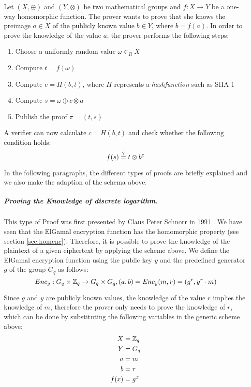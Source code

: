 \documentclass[numbers=noenddot, abstract=on, a4paper, headsepline,
footsepline, oneside, draft=off]{scrreprt}
\newcommand{\myref}[1]{(see section \vref{#1})}
\begin{document}
Let $(X,\oplus)$ and $(Y,\otimes)$ be two mathematical groups and
$f:X \rightarrow Y$ be a one-way homomorphic function. The prover wants to prove
that she knows the preimage $a \in X$ of the publicly known value $b \in Y$,
where $b=f(a)$. In order to prove the knowledge of the value $a$, the prover
performs the following steps:
\begin{enumerate}
  \item Choose a uniformly random value $\omega \in_R X$
  \item Compute $t=f(\omega)$
  \item Compute $c=H(b,t)$, where $H$ represents a \textit{hashfunction} such as
  SHA-1
  \item Compute $s=\omega \oplus c \otimes a$
  \item Publish the proof $\pi = (t,s)$
\end{enumerate}

A verifier can now calculate $c=H(b,t)$ and check whether the following
condition holds:
\begin{equation}
	f(s) \stackrel{?}{=} t \otimes b^c \notag
\end{equation}

 In the following paragraphs, the different types of proofs are briefly
 explained and we also make the adaption of the schema above.
 
\subparagraph{Proving the Knowledge of discrete logarithm.}
This type of Proof was first presented by Claus Peter Schnorr in 1991
\cite{Schnorr91}. We have seen that the ElGamal encryption function has the
homomorphic property \myref{sec:homenc}. Therefore, it is possible to prove the
knowledge of the plaintext of a given ciphertext by applying the scheme above.
We define the ElGamal encryption function using the public key $y$ and the
predefined generator $g$ of the group $G_q$ as follows:
\begin{equation}
	Enc_y:G_q \times \mathbb{Z}_q \rightarrow G_q \times G_q, (a,b) = Enc_y(m,
	r)=(g^r, y^r \cdot m) \notag
\end{equation} 

Since $g$ and $y$ are publicly known values, the knowledge of the value $r$
implies the knowledge of $m$, therefore the prover only needs to prove the
knowledge of $r$, which can be done by substituting the following variables in
the generic scheme above:
\begin{align}
  X &= \mathbb{Z}_q \notag \\
  Y &= G_q \notag \\
  a &=m \notag \\
  b &=r \notag \\
  f(x) &= g^x \notag
\end{align} 
\end{document}
